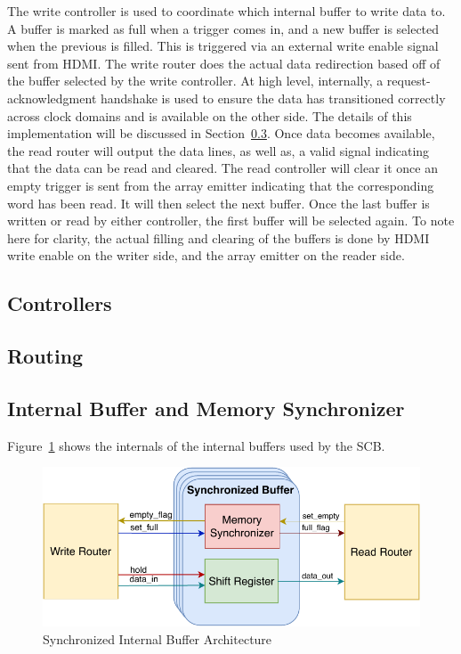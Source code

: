     The write controller is used to coordinate which internal buffer to write data to. A buffer is marked as full when a trigger comes in, and a new buffer is selected when the previous is filled. This is triggered via an external write enable signal sent from HDMI. The write router does the actual data redirection based off of the buffer selected by the write controller. At high level, internally, a request-acknowledgment handshake is used to ensure the data has transitioned correctly across clock domains and is available on the other side. The details of this implementation will be discussed in Section~\ref{Sec:MemorySync}. Once data becomes available, the read router will output the data lines, as well as, a valid signal indicating that the data can be read and cleared. The read controller will clear it once an empty trigger is sent from the array emitter indicating that the corresponding word has been read. It will then select the next buffer. Once the last buffer is written or read by either controller, the first buffer will be selected again. To note here for clarity, the actual filling and clearing of the buffers is done by HDMI write enable on the writer side, and the array emitter on the reader side.

    \subsection{Controllers}

    \subsection{Routing}

    \subsection{Internal Buffer and Memory Synchronizer}
    \label{Sec:MemorySync}

    Figure~\ref{fig:sb_arch} shows the internals of the internal buffers used by the SCB.
    \begin{figure}
        \centering
        \includegraphics[width=1.0\textwidth]{fig/pdp_sb_arch.pdf}
        \caption{Synchronized Internal Buffer Architecture}
        \label{fig:sb_arch}
    \end{figure}

